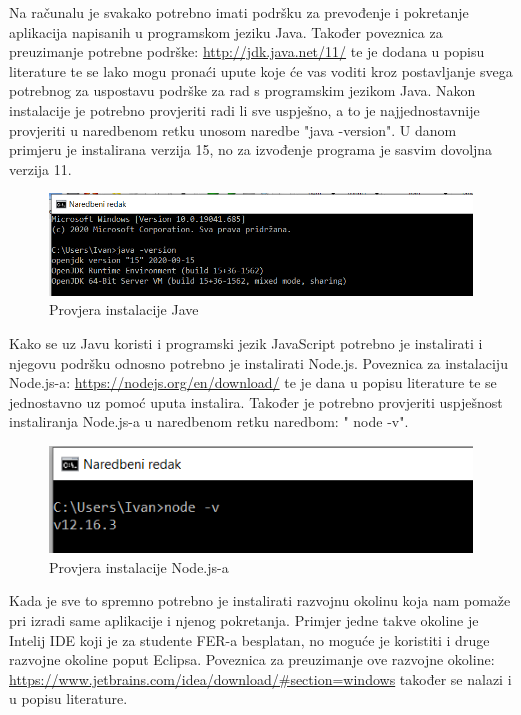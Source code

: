 			Na računalu je svakako potrebno imati podršku za prevođenje i pokretanje aplikacija napisanih u programskom jeziku Java. Također poveznica za preuzimanje potrebne podrške: \url{http://jdk.java.net/11/} te je dodana u popisu literature te se lako mogu pronaći upute koje će vas voditi kroz postavljanje svega potrebnog za uspostavu podrške za rad s programskim jezikom Java. Nakon instalacije je potrebno provjeriti radi li sve uspješno, a to je najjednostavnije provjeriti u naredbenom retku unosom naredbe "java -version". U danom primjeru je instalirana verzija 15, no za izvođenje programa je sasvim dovoljna verzija 11. 
			
			\begin{figure}[H]
				\includegraphics[scale=0.6]{slike/Java.PNG} %
				\centering
				\caption{Provjera instalacije Jave}
				\label{fig:java}
			\end{figure}
			
			Kako se uz Javu koristi i programski jezik JavaScript potrebno je instalirati i njegovu podršku odnosno potrebno je instalirati Node.js. Poveznica za instalaciju Node.js-a: \url{https://nodejs.org/en/download/} te je dana u popisu literature te se jednostavno uz pomoć uputa instalira. Također je potrebno provjeriti uspješnost instaliranja Node.js-a u naredbenom retku naredbom: " node -v".
			
			\begin{figure}[H]
				\includegraphics[scale=0.6]{slike/node.PNG} %
				\centering
				\caption{Provjera instalacije Node.js-a}
				\label{fig:node}
			\end{figure}
		
		Kada je sve to spremno potrebno je instalirati razvojnu okolinu koja nam pomaže pri izradi same aplikacije i njenog pokretanja. Primjer jedne takve okoline je Intelij IDE koji je za studente FER-a besplatan, no moguće je koristiti i druge razvojne okoline poput Eclipsa. Poveznica za preuzimanje ove razvojne okoline:  \url{https://www.jetbrains.com/idea/download/#section=windows}  također se nalazi i u popisu literature.
		
